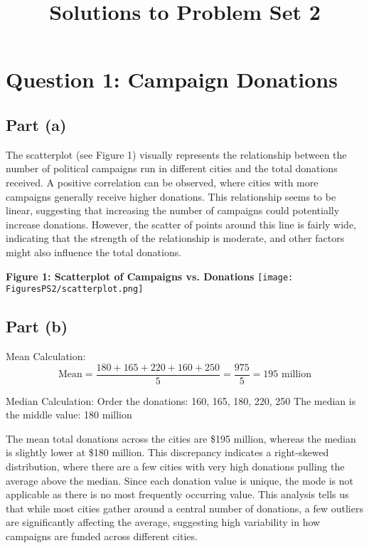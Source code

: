 \documentclass{article}
\title{Solutions to Problem Set 2}
\author{}
\date{}
\begin{document}
\maketitle

\section*{Question 1: Campaign Donations}

\subsection*{Part (a)}
The scatterplot (see Figure 1) visually represents the relationship between the number of political campaigns run in different cities and the total donations received. A positive correlation can be observed, where cities with more campaigns generally receive higher donations. This relationship seems to be linear, suggesting that increasing the number of campaigns could potentially increase donations. However, the scatter of points around this line is fairly wide, indicating that the strength of the relationship is moderate, and other factors might also influence the total donations.

\begin{center}
\textbf{Figure 1: Scatterplot of Campaigns vs. Donations}
    \texttt{[image: FiguresPS2/scatterplot.png]}
\end{center}

\subsection*{Part (b)}
Mean Calculation: \[ \text{Mean} = \frac{180 + 165 + 220 + 160 + 250}{5} = \frac{975}{5} = 195 \text{ million} \]

Median Calculation: Order the donations: 160, 165, 180, 220, 250 The median is the middle value: 180 million


The mean total donations across the cities are \$195 million, whereas the median is slightly lower at \$180 million. This discrepancy indicates a right-skewed distribution, where there are a few cities with very high donations pulling the average above the median. Since each donation value is unique, the mode is not applicable as there is no most frequently occurring value. This analysis tells us that while most cities gather around a central number of donations, a few outliers are significantly affecting the average, suggesting high variability in how campaigns are funded across different cities.
\end{document}
